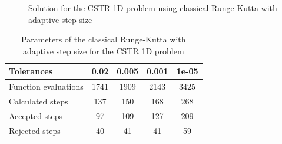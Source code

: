 \begin{figure}[H]
    \centering
    \caption{Solution for the CSTR 1D problem using classical Runge-Kutta with adaptive step size}
    \label{6_5_1D_tols}
\end{figure}

\begin{table}[H]
    \centering
    \begin{tabular}{@{}l|cccc@{}}
    \toprule
    Tolerances           & 0.02 & 0.005 & 0.001 & 1e-05 \\ \midrule
    Function evaluations & 1741 & 1909  & 2143  & 3425  \\
    Calculated steps     & 137  & 150   & 168   & 268   \\
    Accepted steps       & 97   & 109   & 127   & 209   \\
    Rejected steps       & 40   & 41    & 41    & 59    \\ \bottomrule
    \end{tabular}
    \caption{Parameters of the classical Runge-Kutta with adaptive step size for the CSTR 1D problem}
    \label{6_5_1D_tols_table}
\end{table}


